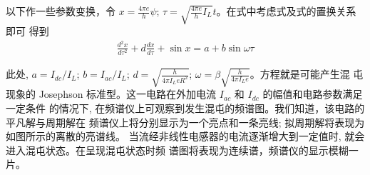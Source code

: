 \documentclass[withoutpreface,bwprint]{cumcmthesis} %
\begin{document}
\begin{appendices}
以下作一些参数变换，令 $ x=\frac{4 \pi e}{h} \psi $; $\tau=\sqrt{\frac{4 \pi e}{h} I_{L}} t  $。在式中考虑式及式的置换关系即可 得到
\begin{align}
\label{eqB6}
\frac{d^{2} x}{d \tau^{2}}+d \frac{d x}{d \tau}+\sin x=a+b \sin \omega \tau
\end{align}

此处,  $a=I_{d c} / I_{L} $; $b=I_{a c} / I_{L} $;  $d=\sqrt{\frac{h}{4 \pi I_{L} e R^{2}}} $; $\omega=\beta \sqrt{\frac{h}{4 \pi I_{L} e}}  $。方程就是可能产生混
屯现象的 Josephson 标准型。这一电路在外加电流  $I_{a c}$  和 $ I_{d c}$  的幅值和电路参数满足一定条件 的情况下, 在频谱仪上可观察到发生混屯的频谱图。我们知道，该电路的平凡解与周期解在 频谱仪上将分别显示为一个亮点和一条亮线; 拟周期解将表现为如图所示的离散的亮谱线。 当流经非线性电感器的电流逐渐增大到一定值时, 就会进入混屯状态。在呈现混屯状态时频 谱图将表现为连续谱，频谱仪的显示模糊一片。

\end{appendices}
\end{document}
